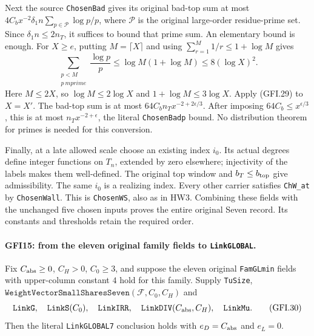 Next the source \texttt{ChosenBad} gives its original bad-top sum
at most
$4C_bx^{-2}\delta_1n\sum_{p\in\mathcal P}\log p/p$, where
$\mathcal P$ is the original large-order residue-prime set.
Since $\delta_1n\le2n_T$, it suffices to bound that prime sum.
An elementary bound is enough.  For $X\ge e$, putting
$M=\lceil X\rceil$ and using $\sum_{r=1}^M1/r\le1+\log M$ gives
\[
 \sum_{\substack{p<M\\p\ {
m prime}}}\frac{\log p}{p}
 \le \log M(1+\log M)\le8(\log X)^2.                  \tag{GFI.29}
\]
Here $M\le2X$, so $\log M\le2\log X$ and
$1+\log M\le3\log X$.  Apply (GFI.29) to $X=X'$.
The bad-top sum is at most
$64C_bn_Tx^{-2+2\epsilon/3}$.  After imposing
$64C_b\le x^{\epsilon/3}$, this is at most
$n_Tx^{-2+\epsilon}$, the literal \texttt{ChosenBadp} bound.
No distribution theorem for primes is needed for this conversion.

Finally, at a late allowed scale choose an existing index $i_0$.
Its actual degrees define integer functions on $T_n$, extended by
zero elsewhere; injectivity of the labels makes them well-defined.
The original top window and $b_T\le b_{\rm top}$ give admissibility.
The same $i_0$ is a realizing index.  Every other carrier satisfies
\texttt{ChW\_at} by \texttt{ChosenWall}.  This is
\texttt{ChosenWS}, also as in HW3.  Combining these fields with the
unchanged five chosen inputs proves the entire original Seven record.
Its constants and thresholds retain the required order.

\paragraph{GFI15: from the eleven original family fields to \texttt{LinkGLOBAL}.}
\label{claim:GFI15}
Fix $C_{\rm abs}\ge0$, $C_H>0$, $C_0\ge3$, and suppose the
eleven original \texttt{FamGLmin} fields with upper-column constant
$4$ hold for this family.  Supply \texttt{TuSize},
$\texttt{WeightVectorSmallSharesSeven}(\mathcal F,C_0,C_H)$ and
\[
 \texttt{LinkG},\quad\texttt{LinkS}(C_0),\quad
 \texttt{LinkIRR},\quad\texttt{LinkDIV}(C_{\rm abs},C_H),\quad
 \texttt{LinkMu}.                                       \tag{GFI.30}
\]
Then the literal \texttt{LinkGLOBAL7} conclusion holds with
$e_D=C_{\rm abs}$ and $e_L=0$.

